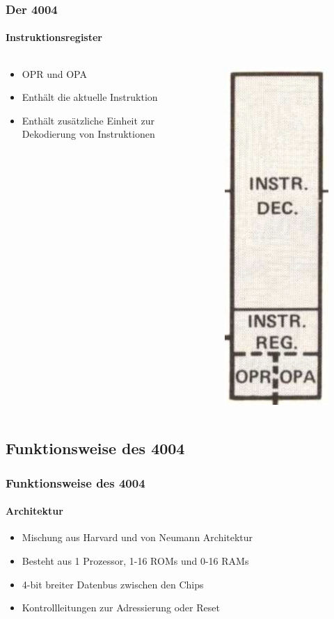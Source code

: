 \begin{frame}
	\frametitle{Der 4004}
	\framesubtitle{Instruktionsregister}
	\begin{columns}
		\begin{column}{.5\textwidth}
			\begin{itemize}
				\item OPR und OPA
				\item Enthält die aktuelle Instruktion
				\item Enthält zusätzliche Einheit zur Dekodierung von Instruktionen
			\end{itemize}
		\end{column}
		\begin{column}{.5\textwidth}
			\begin{figure}[ht]
				\includegraphics[width=0.3\linewidth]{images/instruction_register.png}
			\end{figure}
		\end{column}
	\end{columns}
\end{frame}

\subsection{Funktionsweise des 4004}

\begin{frame}
	\frametitle{Funktionsweise des 4004}
	\framesubtitle{Architektur}
	\begin{itemize}
		\item Mischung aus Harvard und von Neumann Architektur
		\item Besteht aus 1 Prozessor, 1-16 ROMs und 0-16 RAMs
		\item 4-bit breiter Datenbus zwischen den Chips
		\item Kontrollleitungen zur Adressierung oder Reset
	\end{itemize}
\end{frame}

